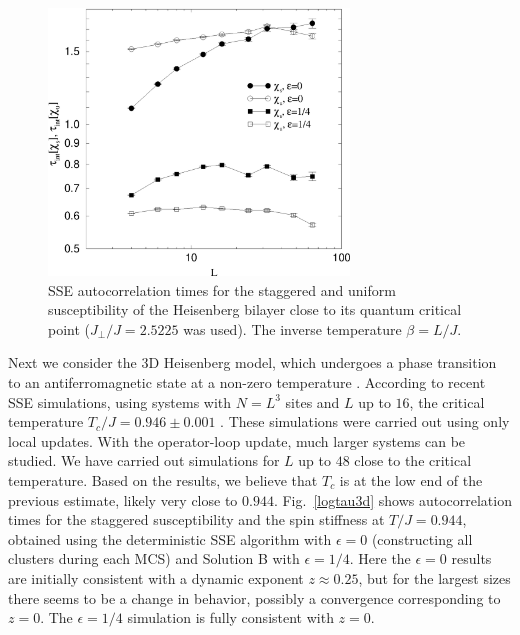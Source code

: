 \documentclass[10pt,pre,aps,twocolumn,showpacs,superscriptaddress,
floatfix]{revtex4}
\begin{document}
\begin{figure}
\includegraphics[clip,width=8cm]{fig27.eps}
\caption{SSE autocorrelation times for the staggered and uniform susceptibility
of the Heisenberg bilayer close to its quantum critical point 
($J_\perp/J=2.5225$ was used). The inverse temperature $\beta=L/J$.}
\label{logtau2d}
\end{figure}

Next we consider the 3D Heisenberg model, which undergoes a phase transition
to an antiferromagnetic state at a non-zero temperature \cite{rushbrooke}.
According to recent SSE simulations, using systems with $N=L^3$ sites and
$L$ up to $16$, the critical temperature $T_c/J = 0.946 \pm 0.001$
\cite{aws3d}. These simulations were carried out using only local updates. 
With the operator-loop update, much larger systems can be studied. We have 
carried out simulations for $L$ up to $48$ close to the critical temperature. 
Based on the results, we believe that $T_c$ is at the low end of the previous 
estimate, likely very close to $0.944$. Fig.~\ref{logtau3d} shows 
autocorrelation times for the staggered susceptibility and the spin 
stiffness at $T/J=0.944$, obtained using the deterministic SSE algorithm 
with $\epsilon=0$ (constructing all clusters during each MCS) and Solution 
B with $\epsilon=1/4$. Here the $\epsilon=0$ results are initially consistent
with a dynamic exponent $z \approx 0.25$, but for the largest sizes there
seems to be a change in behavior, possibly a convergence corresponding to
$z = 0$. The $\epsilon=1/4$ simulation is fully consistent with $z=0$.
\end{document}
